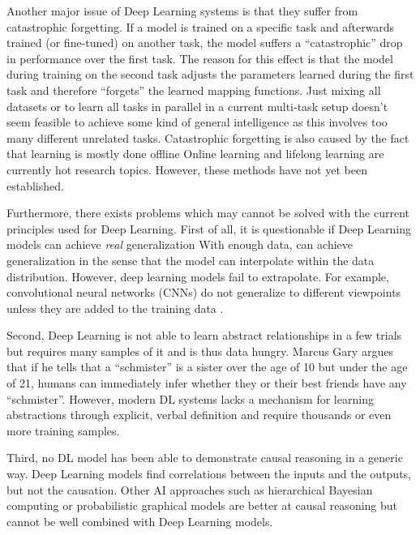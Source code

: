 Another major issue of Deep Learning systems is that they suffer from catastrophic forgetting.
If a model is trained on a specific task and afterwards trained (or fine-tuned) on another task, the model suffers a ``catastrophic'' drop in performance over the first task.
The reason for this effect is that the model during training on the second task adjusts the parameters learned during the first task and therefore ``forgets'' the learned mapping functions.
Just mixing all datasets or to learn all tasks in parallel in a current multi-task setup \cite{Zhang_Yang_2021} doesn't seem feasible to achieve some kind of general intelligence as this involves too many different unrelated tasks.
Catastrophic forgetting is also caused by the fact that learning is mostly done offline%
Online learning \cite{Sahoo_Pham_Lu_Hoi_2017} and lifelong learning \cite{Parisi_Kemker_Part_Kanan_Wermter_2019} are currently hot research topics.
However, these methods have not yet been established.

Furthermore, there exists problems which may cannot be solved with the current principles used for Deep Learning.
First of all, it is questionable if Deep Learning models can achieve \emph{real} generalization%
With enough data, can achieve generalization in the sense that the model can interpolate within the data distribution.
However, deep learning models fail to extrapolate.
For example, convolutional neural networks (CNNs) do not generalize to different viewpoints unless they are added to the training data .

Second, Deep Learning is not able to learn abstract relationships in a few trials but requires many samples of it and is thus data hungry.
Marcus Gary  argues that if he tells that a ``schmister'' is a sister over the age of 10 but under the age of 21, humans can  immediately infer whether they or their best friends have any ``schmister''. However, modern DL systems lacks a mechanism for learning abstractions through explicit, verbal definition and require thousands or even more training samples.

Third, no DL model has been able to demonstrate causal reasoning in a generic way.
Deep Learning models find correlations between the inputs and the outputs, but not the causation.
Other AI approaches such as hierarchical Bayesian computing or probabilistic graphical models are better at causal reasoning but cannot be well combined with Deep Learning models.

